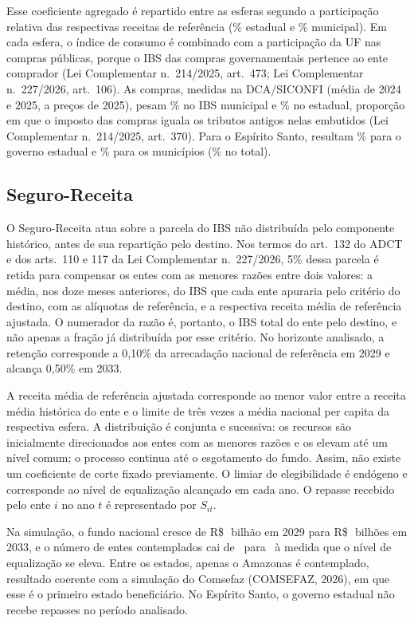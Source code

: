 \documentclass[12pt,a4paper]{article}
\newcommand{\Rs}{R\$\,}
\newcommand{\nn}{n.\textordmasculine}
\begin{document}
Esse coeficiente agregado é repartido entre as esferas segundo a participação relativa das respectivas receitas de referência (\NumFracEst\% estadual e \NumFracMuni\% municipal). Em cada esfera, o índice de consumo é combinado com a participação da UF nas compras públicas, porque o IBS das compras governamentais pertence ao ente comprador (Lei Complementar \nn~214/2025, art.~473; Lei Complementar \nn~227/2026, art.~106). As compras, medidas na DCA/SICONFI (média de 2024 e 2025, a preços de 2025), pesam \NumThetaM\% no IBS municipal e \NumThetaEInt\% no estadual, proporção em que o imposto das compras iguala os tributos antigos nelas embutidos (Lei Complementar \nn~214/2025, art.~370). Para o Espírito Santo, resultam \NumCoefPq\% para o governo estadual e \NumCoefMuniq\% para os municípios (\NumPhiTotal\% no total).

\subsection{Seguro-Receita}

O Seguro-Receita atua sobre a parcela do IBS não distribuída pelo componente histórico, antes de sua repartição pelo destino. Nos termos do art.~132 do ADCT e dos arts.~110 e 117 da Lei Complementar \nn~227/2026, 5\% dessa parcela é retida para compensar os entes com as menores razões entre dois valores: a média, nos doze meses anteriores, do IBS que cada ente apuraria pelo critério do destino, com as alíquotas de referência, e a respectiva receita média de referência ajustada. O numerador da razão é, portanto, o IBS total do ente pelo destino, e não apenas a fração já distribuída por esse critério. No horizonte analisado, a retenção corresponde a 0,10\% da arrecadação nacional de referência em 2029 e alcança 0,50\% em 2033.

A receita média de referência ajustada corresponde ao menor valor entre a receita média histórica do ente e o limite de três vezes a média nacional per capita da respectiva esfera. A distribuição é conjunta e sucessiva: os recursos são inicialmente direcionados aos entes com as menores razões e os elevam até um nível comum; o processo continua até o esgotamento do fundo. Assim, não existe um coeficiente de corte fixado previamente. O limiar de elegibilidade é endógeno e corresponde ao nível de equalização alcançado em cada ano. O repasse recebido pelo ente $i$ no ano $t$ é representado por $S_{it}$.

Na simulação, o fundo nacional cresce de \Rs\NumFundoUm\ bilhão em 2029 para \Rs\NumFundoCinco\ bilhões em 2033, e o número de entes contemplados cai de \NumBenefUm\ para \NumBenefCinco\ à medida que o nível de equalização se eleva. Entre os estados, apenas o Amazonas é contemplado, resultado coerente com a simulação do Comsefaz (COMSEFAZ, 2026), em que esse é o primeiro estado beneficiário. No Espírito Santo, o governo estadual não recebe repasses no período analisado.
\end{document}
